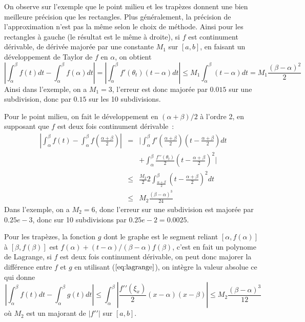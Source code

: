 \documentclass[a4paper,11pt]{book}
\begin{document}
\begin{giacjshere}
On observe sur l'exemple que le point milieu et les trapèzes donnent
une bien meilleure précision que les rectangles. Plus généralement,
la précision de l'approximation n'est pas la même selon le choix
de méthode.
Ainsi pour les rectangles à gauche (le résultat est le même
à droite), si $f$ est continument dérivable, de dérivée majorée
par une constante $M_1$ sur $[a,b]$, en faisant un
développement de Taylor de $f$ en $\alpha$, on obtient
\[ |\int_{\alpha}^{\beta} f(t) dt - \int_{\alpha}^{\beta} f(\alpha) dt |
= | \int_{\alpha}^{\beta} f'(\theta_t)(t-\alpha) dt |
\leq M_1 \int_{\alpha}^{\beta} (t-\alpha) dt = M_1\frac{(\beta-\alpha)^2}{2}
\]
Ainsi dans l'exemple, on a $M_1=3$, l'erreur est donc majorée par $0.015$
sur une subdivision, donc par $0.15$ sur les 10 subdivisions.

Pour le point milieu, on fait le développement en $(\alpha+\beta)/2$ à l'ordre
2, en supposant que $f$ est deux fois continument dérivable~:
\begin{eqnarray*}
 |\int_{\alpha}^{\beta} f(t)  - \int_{\alpha}^{\beta} f(\frac{\alpha+\beta}{2})  |
&= &| \int_{\alpha}^{\beta} f'(\frac{\alpha+\beta}{2})(t-\frac{\alpha+\beta}{2}) dt
\\
& &
+  \int_{\alpha}^{\beta} \frac{f'{'}(\theta_t)}{2}(t-\frac{\alpha+\beta}{2})^2 |
\\
&\leq & \frac{M_2}{2} 2 \int_{\frac{\alpha+\beta}{2}}^{\beta}
(t-\frac{\alpha+\beta}{2})^2 dt  \\
& \leq & M_2\frac{(\beta-\alpha)^3}{24}
\end{eqnarray*}
Dans l'exemple, on a $M_2=6$, donc l'erreur sur une subdivision est
majorée par $0.25e-3$, donc sur 10 subdivisions par $0.25e-2=0.0025$.

Pour les trapèzes, la fonction $g$ dont le graphe est le segment reliant
$[\alpha,f(\alpha)]$ à $[\beta,f(\beta)]$ est $f(\alpha)+(t-\alpha)/(\beta-\alpha)f(\beta)$,
c'est en fait un polynome de Lagrange, si $f$ est deux fois continument
dérivable, on peut donc majorer la différence
entre $f$ et $g$ en utilisant (\(\ref{eq:lagrange}\)), on intègre la valeur
absolue ce qui donne
\[ |\int_{\alpha}^{\beta} f(t) dt - \int_{\alpha}^{\beta} g(t) dt |
\leq \int_{\alpha}^{\beta} |\frac{f'{'}(\xi_x)}{2} (x-\alpha)(x-\beta)|
\leq M_2 \frac{(\beta-\alpha)^3}{12} \]
où $M_2$ est un majorant de $|f'{'}|$ sur $[a,b]$.


\end{giacjshere}
\end{document}

